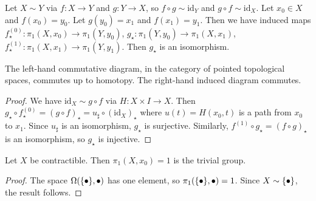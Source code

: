 \begin{corollary}
	Let \( X \sim Y \) via \( f : X \to Y \) and \( g \colon Y \to X \), so \( f \circ g \sim \mathrm{id}_Y \) and \( g \circ f \sim \mathrm{id}_X \).
	Let \( x_0 \in X \) and \( f(x_0) = y_0 \).
	Let \( g(y_0) = x_1 \) and \( f(x_1) = y_1 \).
	Then we have induced maps \( f^{(0)}_\star \colon \pi_1(X,x_0) \to \pi_1(Y,y_0) \), \( g_\star \colon \pi_1(Y,y_0) \to \pi_1(X,x_1) \), \( f^{(1)}_\star \colon \pi_1(X,x_1) \to \pi_1(Y,y_1) \).
	Then \( g_\star \) is an isomorphism.
	\begin{center}
	\end{center}
	The left-hand commutative diagram, in the category of pointed topological spaces, commutes up to homotopy.
	The right-hand induced diagram commutes.
\end{corollary}
\begin{proof}
	We have \( \mathrm{id}_X \sim g \circ f \) via \( H \colon X \times I \to X \).
	Then \( g_\star \circ f^{(0)}_\star = (g \circ f)_\star = u_\sharp \circ (\mathrm{id}_X)_\star \) where \( u(t) = H(x_0,t) \) is a path from \( x_0 \) to \( x_1 \).
	Since \( u_\sharp \) is an isomorphism, \( g_\star \) is surjective.
	Similarly, \( f^{(1)} \circ g_\star = (f \circ g)_\star \) is an isomorphism, so \( g_\star \) is injective.
\end{proof}
\begin{corollary}
	Let \( X \) be contractible.
	Then \( \pi_1(X,x_0) = 1 \) is the trivial group.
\end{corollary}
\begin{proof}
	The space \( \Omega(\qty{\bullet},\bullet) \) has one element, so \( \pi_1(\qty{\bullet},\bullet) = 1 \).
	Since \( X \sim \qty{\bullet} \), the result follows.
\end{proof}
